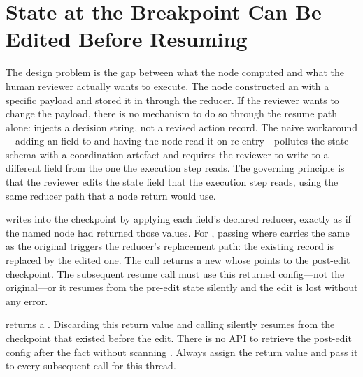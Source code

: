 \section{State at the Breakpoint Can Be Edited Before Resuming}
\label{sec:hitl-edit}

The design problem is the gap between what the node computed and what the
human reviewer actually wants to execute. The node constructed an
 with a specific payload and stored it in
 through the  reducer. If
the reviewer wants to change the payload, there is no mechanism to do so
through the resume path alone:  injects a
decision string, not a revised action record. The naive workaround---adding
an  field to  and having the
node read it on re-entry---pollutes the state schema with a coordination
artefact and requires the reviewer to write to a different field from the
one the execution step reads. The governing principle is that the reviewer
edits the state field that the execution step reads, using the same reducer
path that a node return would use.

 writes 
into the checkpoint by applying each field's declared reducer, exactly as if
the named node had returned those values. For ,
passing  where
 carries the same  as the original
triggers the  reducer's replacement path: the
existing record is replaced by the edited one. The call returns a new
 whose  points to
the post-edit checkpoint. The subsequent resume call must use this returned
config---not the original---or it resumes from the pre-edit state silently
and the edit is lost without any error.

\begin{warningbox}
 returns a . Discarding this
return value and calling  silently resumes from the checkpoint that existed
before the edit. There is no API to retrieve the post-edit config after the
fact without scanning . Always assign the
return value and pass it to every subsequent call for this thread.
\end{warningbox}

